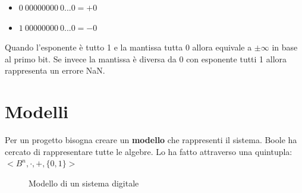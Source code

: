 \documentclass[a4paper]{article}
\theoremstyle{break}
\theoremstyle{break}
\theoremstyle{break}
\theoremstyle{break}
\begin{document}
\begin{itemize}
	\item $0\:00000000\:0...0 = +0$
	\item $1\:00000000\:0...0 = -0$
\end{itemize}

Quando l'esponente è tutto 1 e la mantissa tutta 0 allora equivale a \( \pm \infty \)
in base al primo bit. Se invece la mantissa è diversa da 0 con esponente tutti 1
allora rappresenta un errore NaN.

\section{Modelli}
Per un progetto bisogna creare un \textbf{modello} che rappresenti il sistema.
Boole ha cercato di rappresentare tutte le algebre. Lo ha fatto attraverso
una quintupla: \( <B^{n}, \cdot, + ,\{0,1\}> \)
\begin{figure}[H]
	\centering
    \caption{Modello di un sistema digitale}
\end{figure}
\end{document}

